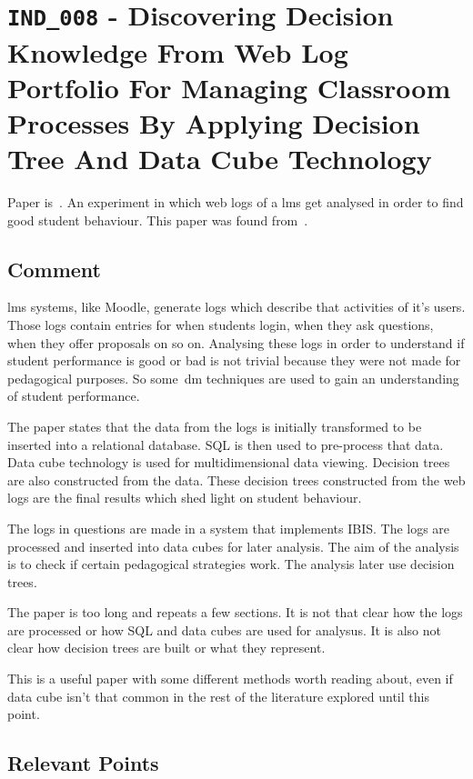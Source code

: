 \section{\texttt{IND\_008} - Discovering Decision Knowledge From Web Log
Portfolio For Managing Classroom Processes By Applying Decision Tree And Data
Cube Technology}

Paper is~\cite{ind_008}. An experiment in which web logs of a \gls{lms} get
analysed in order to find good student behaviour. This paper was found
from~\cite{ind_007}.

\subsection{Comment}

\gls{lms} systems, like Moodle, generate logs which describe that activities of
it's users. Those logs contain entries for when students login, when they ask
questions, when they offer proposals on so on. Analysing these logs in order to
understand if student performance is good or bad is not trivial because they
were not made for pedagogical purposes. So some~\gls{dm} techniques are used to
gain an understanding of student performance.

The paper states that the data from the logs is initially transformed to be
inserted into a relational database. SQL is then used to pre-process that data.
Data cube technology is used for multidimensional data viewing. Decision trees
are also constructed from the data. These decision trees constructed from the
web logs are the final results which shed light on student behaviour.

The logs in questions are made in a system that implements IBIS. The logs are
processed and inserted into data cubes for later analysis. The aim of the
analysis is to check if certain pedagogical strategies work. The analysis later
use decision trees.

The paper is too long and repeats a few sections. It is not that clear how the
logs are processed or how SQL and data cubes are used for analysus. It is also
not clear how decision trees are built or what they represent.

This is a useful paper with some different methods worth reading about, even if
data cube isn't that common in the rest of the literature explored until this
point.

\subsection{Relevant Points}

